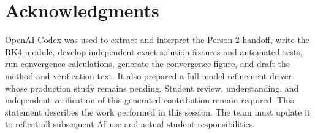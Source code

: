 \section{Acknowledgments}
OpenAI Codex was used to extract and interpret the Person 2 handoff, write the
RK4 module, develop independent exact solution fixtures and automated tests,
run convergence calculations, generate the convergence figure, and draft the
method and verification text. It also prepared a full model refinement driver
whose production study remains pending. Student review, understanding, and
independent verification of this generated contribution remain required.
This statement describes the work performed in this session. The team must
update it to reflect all subsequent AI use and actual student responsibilities.

